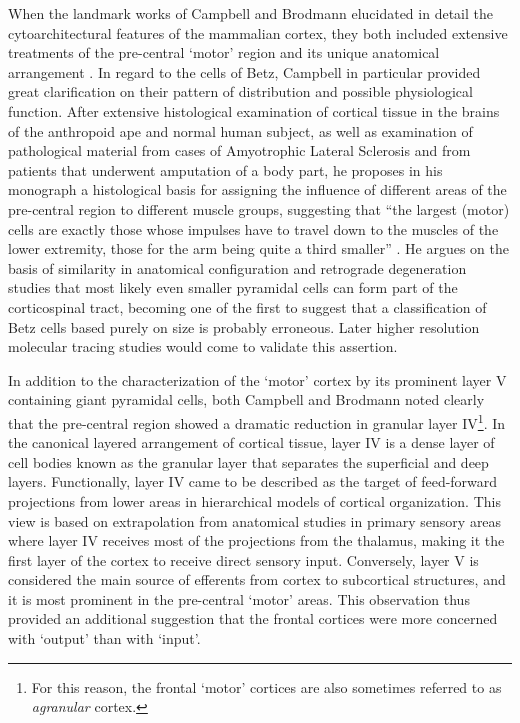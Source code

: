 When the landmark works of Campbell and Brodmann elucidated in detail the cytoarchitectural features of the mammalian cortex, they both included extensive treatments of the pre-central ‘motor’ region and its unique anatomical arrangement \cite{Campbell1905,Brodmann1909}. In regard to the cells of Betz, Campbell in particular provided great clarification on their pattern of distribution and possible physiological function. After extensive histological examination of cortical tissue in the brains of the anthropoid ape and normal human subject, as well as examination of pathological material from cases of Amyotrophic Lateral Sclerosis and from patients that underwent amputation of a body part, he proposes in his monograph a histological basis for assigning the influence of different areas of the pre-central region to different muscle groups, suggesting that ``the largest (motor) cells are exactly those whose impulses have to travel down to the muscles of the lower extremity, those for the arm being quite a third smaller'' \cite[p.33]{Campbell1905}. He argues on the basis of similarity in anatomical configuration and retrograde degeneration studies that most likely even smaller pyramidal cells can form part of the corticospinal tract, becoming one of the first to suggest that a classification of Betz cells based purely on size is probably erroneous. Later higher resolution molecular tracing studies would come to validate this assertion.

In addition to the characterization of the ‘motor’ cortex by its prominent layer V containing giant pyramidal cells, both Campbell and Brodmann noted clearly that the pre-central region showed a dramatic reduction in granular layer IV\footnote{For this reason, the frontal ‘motor’ cortices are also sometimes referred to as \emph{agranular} cortex.}. In the canonical layered arrangement of cortical tissue, layer IV is a dense layer of cell bodies known as the granular layer that separates the superficial and deep layers. Functionally, layer IV came to be described as the target of feed-forward projections from lower areas in hierarchical models of cortical organization. This view is based on extrapolation from anatomical studies in primary sensory areas where layer IV receives most of the projections from the thalamus, making it the first layer of the cortex to receive direct sensory input. Conversely, layer V is considered the main source of efferents from cortex to subcortical structures, and it is most prominent in the pre-central ‘motor’ areas. This observation thus provided an additional suggestion that the frontal cortices were more concerned with ‘output’ than with ‘input’.

